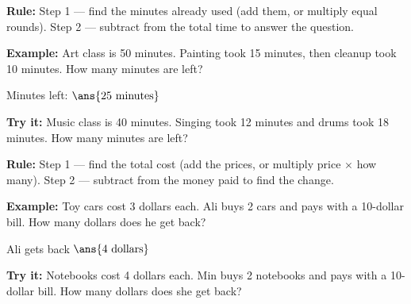 \documentclass[12pt]{article}
\begin{document}


\begin{formulabox}
\textbf{Rule:} Step 1 --- find the minutes already used (add them, or multiply
equal rounds). Step 2 --- subtract from the total time to answer the question.
\end{formulabox}

\begin{examplebox}
\textbf{Example:} Art class is 50 minutes. Painting took 15 minutes, then
cleanup took 10 minutes. How many minutes are left?

Minutes left: $\ans{25\ \text{minutes}}$
\end{examplebox}

\begin{tryitbox}
\textbf{Try it:} Music class is 40 minutes. Singing took 12 minutes and drums
took 18 minutes. How many minutes are left?\\[2pt]
\end{tryitbox}


\begin{formulabox}
\textbf{Rule:} Step 1 --- find the total cost (add the prices, or multiply
price $\times$ how many). Step 2 --- subtract from the money paid to find the
change.
\end{formulabox}

\begin{examplebox}
\textbf{Example:} Toy cars cost 3 dollars each. Ali buys 2 cars and pays with
a 10-dollar bill. How many dollars does he get back?

Ali gets back $\ans{4\ \text{dollars}}$
\end{examplebox}

\begin{tryitbox}
\textbf{Try it:} Notebooks cost 4 dollars each. Min buys 2 notebooks and pays
with a 10-dollar bill. How many dollars does she get back?\\[2pt]
\end{tryitbox}
\end{document}
